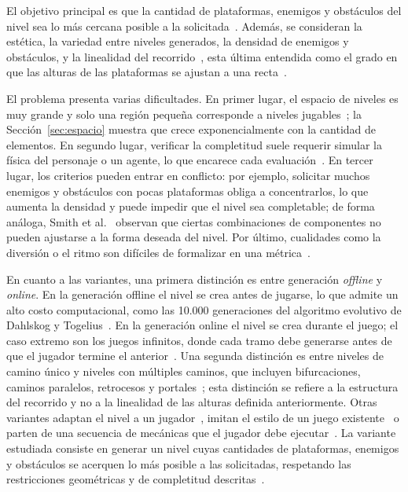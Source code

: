 \documentclass[letter, 10pt]{article}
\begin{document}
El objetivo principal es que la cantidad de plataformas, enemigos y obst\'aculos del nivel sea lo m\'as cercana posible a la solicitada~\cite{Saavedra2026}. Adem\'as, se consideran la est\'etica, la variedad entre niveles generados, la densidad de enemigos y obst\'aculos, y la linealidad del recorrido~\cite{Saavedra2026}, esta \'ultima entendida como el grado en que las alturas de las plataformas se ajustan a una recta~\cite{Smith2011}.

El problema presenta varias dificultades. En primer lugar, el espacio de niveles es muy grande y solo una regi\'on peque\~na corresponde a niveles jugables~\cite{Dahlskog2013}; la Secci\'on~\ref{sec:espacio} muestra que crece exponencialmente con la cantidad de elementos. En segundo lugar, verificar la completitud suele requerir simular la f\'isica del personaje o un agente, lo que encarece cada evaluaci\'on~\cite{Green2020,DePontes2022}. En tercer lugar, los criterios pueden entrar en conflicto: por ejemplo, solicitar muchos enemigos y obst\'aculos con pocas plataformas obliga a concentrarlos, lo que aumenta la densidad y puede impedir que el nivel sea completable; de forma an\'aloga, Smith et al.~\cite{Smith2011} observan que ciertas combinaciones de componentes no pueden ajustarse a la forma deseada del nivel. Por \'ultimo, cualidades como la diversi\'on o el ritmo son dif\'iciles de formalizar en una m\'etrica~\cite{Togelius2011, Dahlskog2013}.


En cuanto a las variantes, una primera distinci\'on es entre generaci\'on \emph{offline} y \emph{online}. En la generaci\'on offline el nivel se crea antes de jugarse, lo que admite un alto costo computacional, como las 10.000 generaciones del algoritmo evolutivo de Dahlskog y Togelius~\cite{Dahlskog2013}. En la generaci\'on online el nivel se crea durante el juego; el caso extremo son los juegos infinitos, donde cada tramo debe generarse antes de que el jugador termine el anterior~\cite{Togelius2011, DePontes2022}. Una segunda distinci\'on es entre niveles de camino \'unico y niveles con m\'ultiples caminos, que incluyen bifurcaciones, caminos paralelos, retrocesos y portales~\cite{Compton2006}; esta distinci\'on se refiere a la estructura del recorrido y no a la linealidad de las alturas definida anteriormente. Otras variantes adaptan el nivel a un jugador~\cite{Togelius2011}, imitan el estilo de un juego existente~\cite{Dahlskog2013, Summerville2016} o parten de una secuencia de mec\'anicas que el jugador debe ejecutar~\cite{Green2020}. La variante estudiada consiste en generar un nivel cuyas cantidades de plataformas, enemigos y obst\'aculos se acerquen lo m\'as posible a las solicitadas, respetando las restricciones geom\'etricas y de completitud descritas~\cite{Saavedra2026}.
\end{document}
